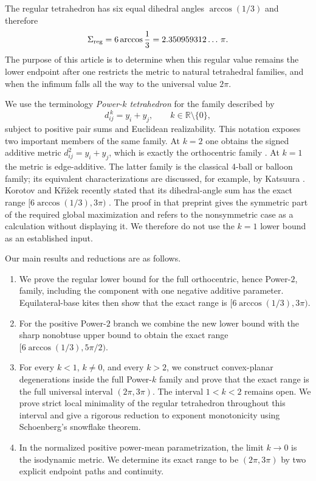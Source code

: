 \documentclass[11pt,a4paper]{article}
\theoremstyle{definition}
\theoremstyle{remark}
\begin{document}
The regular tetrahedron has six equal dihedral angles $\arccos(1/3)$ and
therefore
\begin{equation}\label{eq:regular-value}
  \Sigma_{\rm reg}=6\arccos\frac13
  =2.350959312\ldots\,\pi.
\end{equation}
The purpose of this article is to determine when this regular value remains
the lower endpoint after one restricts the metric to natural tetrahedral
families, and when the infimum falls all the way to the universal value
$2\pi$.

We use the terminology \emph{Power-$k$ tetrahedron} for the family described
by
\begin{equation}\label{eq:power-k-intro}
 d_{ij}^{\,k}=y_i+y_j,\qquad k\in\mathbb R\setminus\{0\},
\end{equation}
subject to positive pair sums and Euclidean realizability.  This notation
exposes two important members of the same family.  At $k=2$ one obtains the
signed additive metric
$d_{ij}^2=y_i+y_j$, which is exactly the orthocentric family
\cite{EdmondsHajjaMartini2005,HajjaHammoudeh2014}.  At $k=1$ the metric is
edge-additive.  The latter family is the classical 4-ball or balloon family;
its equivalent characterizations are discussed, for example, by Katsuura
\cite{Katsuura2021}.  Korotov and K\v{r}\'\i\v{z}ek recently stated that its
dihedral-angle sum has the exact range
$[6\arccos(1/3),3\pi)$ \cite[Theorem~9]{KorotovKrizek2026}.  The proof in
that preprint gives the symmetric part of the required global maximization
and refers to the nonsymmetric case as a calculation without displaying it.
We therefore do not use the $k=1$ lower bound as an established input.

Our main results and reductions are as follows.
\begin{enumerate}[label=\textup{(\roman*)},leftmargin=8mm]
\item We prove the regular lower bound for the full orthocentric, hence
Power-$2$, family, including the component with one negative additive
parameter.  Equilateral-base kites then show that the exact range is
$[6\arccos(1/3),3\pi)$.
\item For the positive Power-$2$ branch we combine the new lower bound with
the sharp nonobtuse upper bound to obtain the exact range
$[6\arccos(1/3),5\pi/2)$.
\item For every $k<1$, $k\ne0$, and every $k>2$, we construct convex-planar
degenerations inside the full Power-$k$ family and prove that the exact range
is the full universal interval $(2\pi,3\pi)$.  The interval $1<k<2$
remains open.  We prove strict local minimality of the regular tetrahedron
throughout this interval and give a rigorous reduction to exponent
monotonicity using Schoenberg's snowflake theorem.
\item In the normalized positive power-mean parametrization, the limit
$k\to0$ is the isodynamic metric.  We determine its exact range to be
$(2\pi,3\pi)$ by two explicit endpoint paths and continuity.
\end{enumerate}
\end{document}
